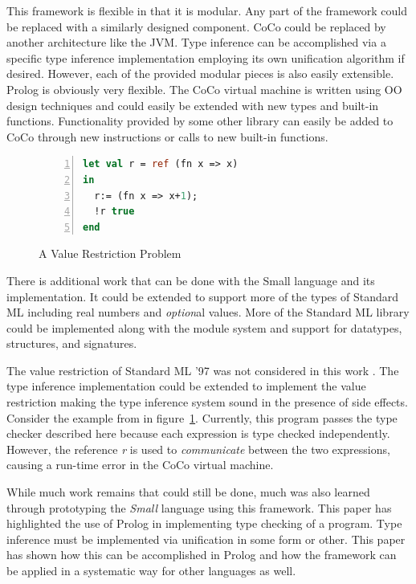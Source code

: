 \documentclass[10pt]{luthercs}
\begin{document}
This framework is flexible in that it is modular. Any part of the framework could be replaced with a similarly designed component. CoCo could be replaced by another architecture like the JVM. Type inference can be accomplished via a specific type inference implementation employing its own unification algorithm if desired. However, each of the provided modular pieces is also easily extensible. Prolog is obviously very flexible. The CoCo virtual machine is written using OO design techniques and could easily be extended with new types and built-in functions. Functionality provided by some other library can easily be added to CoCo through new instructions or calls to new built-in functions. 

\begin{figure}[htbp]
\begin{lstlisting}[language=ML,numbers=left,numberstyle=\tiny]
let val r = ref (fn x => x)
in
  r:= (fn x => x+1);
  !r true
end
\end{lstlisting}
\caption{A Value Restriction Problem}
\label{reftypes}
\end{figure}

There is additional work that can be done with the Small language and its implementation. It could be extended to support more of the types of Standard ML including real numbers and {\em option}al values. More of the Standard ML library could be implemented along with the module system and support for datatypes, structures, and signatures. 

The value restriction of Standard ML '97 was not considered in this work \cite{mltypes}. The type inference implementation could be extended to implement the value restriction making the type inference system sound in the presence of side effects. Consider the example from \cite{mltypes} in figure~\ref{reftypes}. Currently, this program passes the type checker described here because each expression is type checked independently. However, the reference {\em r} is used to {\em communicate} between the two expressions, causing a run-time error in the CoCo virtual machine. 

While much work remains that could still be done, much was also learned through prototyping the {\em Small} language using this framework. This paper has highlighted the use of Prolog in implementing type checking of a program. Type inference must be implemented via unification in some form or other. This paper has shown how this can be accomplished in Prolog and how the framework can be applied in a systematic way for other languages as well. 
\end{document}
